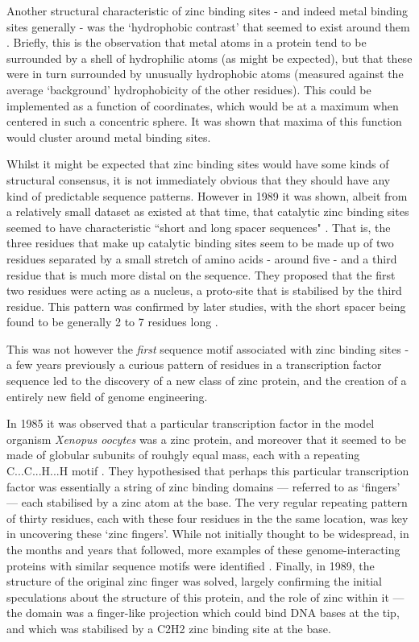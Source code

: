 Another structural characteristic of zinc binding sites - and indeed metal binding sites generally - was the `hydrophobic contrast' that seemed to exist around them \cite{yamashita1990metal,gregory1993prediction}. Briefly, this is the observation that metal atoms in a protein tend to be surrounded by a shell of hydrophilic atoms (as might be expected), but that these were in turn surrounded by unusually hydrophobic atoms (measured against the average `background' hydrophobicity of the other residues). This could be implemented as a function of coordinates, which would be at a maximum when centered in such a concentric sphere. It was shown that maxima of this function would cluster around metal binding sites.

Whilst it might be expected that zinc binding sites would have some kinds of structural consensus, it is not immediately obvious that they should have any kind of predictable sequence patterns. However in 1989 it was shown, albeit from a relatively small dataset as existed at that time, that catalytic zinc binding sites seemed to have characteristic ``short and long spacer sequences" \cite{vallee1989short}. That is, the three residues that make up catalytic binding sites seem to be made up of two residues separated by a small stretch of amino acids - around five - and a third residue that is much more distal on the sequence. They proposed that the first two residues were acting as a nucleus, a proto-site that is stabilised by the third residue. This pattern was confirmed by later studies, with the short spacer being found to be generally 2 to 7 residues long \cite{patel2007analysis}.

This was not however the \textit{first} sequence motif associated with zinc binding sites - a few years previously a curious pattern of residues in a transcription factor sequence led to the discovery of a new class of zinc protein, and the creation of a entirely new field of genome engineering.

In 1985 it was observed that a particular transcription factor in the model organism \emph{Xenopus oocytes} was a zinc protein, and moreover that it seemed to be made of globular subunits of rouhgly equal mass, each with a repeating C...C...H...H motif \cite{miller1985repetitive}. They hypothesised that perhaps this particular transcription factor was essentially a string of zinc binding domains --- referred to as `fingers' --- each stabilised by a zinc atom at the base. The very regular repeating pattern of thirty residues, each with these four residues in the the same location, was key in uncovering these `zinc fingers'. While not initially thought to be widespread, in the months and years that followed, more examples of these genome-interacting proteins with similar sequence motifs were identified \cite{payre1988finger}. Finally, in 1989, the structure of the original zinc finger was solved, largely confirming the initial speculations about the structure of this protein, and the role of zinc within it --- the domain was a finger-like projection which could bind DNA bases at the tip, and which was stabilised by a C2H2 zinc binding site at the base.


